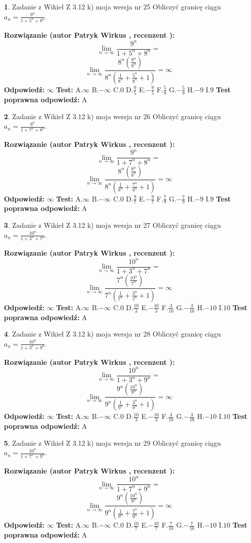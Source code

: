 \documentclass[12pt, a4paper]{article}
\theoremstyle{definition} %
\newtheorem{zad}{}
\newcommand{\zadStart}[1]{\begin{zad}#1\newline}
\newcommand{\zadStop}{\end{zad}}
\newcommand{\rozwStart}[2]{\noindent \textbf{Rozwiązanie (autor #1 , recenzent #2): }\newline}
\newcommand{\rozwStop}{\newline}
\newcommand{\odpStart}{\noindent \textbf{Odpowiedź:}\newline}
\newcommand{\odpStop}{\newline}
\newcommand{\testStart}{\noindent \textbf{Test:}\newline}
\newcommand{\testStop}{\newline}
\newcommand{\kluczStart}{\noindent \textbf{Test poprawna odpowiedź:}\newline}
\newcommand{\kluczStop}{\newline}
\begin{document}
\zadStart{Zadanie z Wikieł Z 3.12 k) moja wersja nr 25}
Obliczyć granicę ciągu $a_{n}=\frac{9^{n}}{1+5^{n} + 8^{n}}$.
\zadStop
\rozwStart{Patryk Wirkus}{}
$$\lim\limits_{n\to\infty}\frac{9^{n}}{1+5^{n} + 8^{n}}=$$
$$\lim\limits_{n\to\infty}\frac{8^{n}(\frac{9^{n}}{8^{n}} )}{8^{n}(\frac{1}{8^{n}}+\frac{5^{n}}{8^{n}}+1)} = \infty$$
\rozwStop
\odpStart
$\infty$
\odpStop
\testStart
A.$\infty$
B.$-\infty$
C.$0$
D.$\frac{9}{5}$
E.$-\frac{9}{5}$
F.$\frac{5}{9}$
G.$-\frac{5}{9}$
H.$-9$
I.$9$
\testStop
\kluczStart
A
\kluczStop



\zadStart{Zadanie z Wikieł Z 3.12 k) moja wersja nr 26}
Obliczyć granicę ciągu $a_{n}=\frac{9^{n}}{1+7^{n} + 8^{n}}$.
\zadStop
\rozwStart{Patryk Wirkus}{}
$$\lim\limits_{n\to\infty}\frac{9^{n}}{1+7^{n} + 8^{n}}=$$
$$\lim\limits_{n\to\infty}\frac{8^{n}(\frac{9^{n}}{8^{n}} )}{8^{n}(\frac{1}{8^{n}}+\frac{7^{n}}{8^{n}}+1)} = \infty$$
\rozwStop
\odpStart
$\infty$
\odpStop
\testStart
A.$\infty$
B.$-\infty$
C.$0$
D.$\frac{9}{7}$
E.$-\frac{9}{7}$
F.$\frac{7}{9}$
G.$-\frac{7}{9}$
H.$-9$
I.$9$
\testStop
\kluczStart
A
\kluczStop



\zadStart{Zadanie z Wikieł Z 3.12 k) moja wersja nr 27}
Obliczyć granicę ciągu $a_{n}=\frac{10^{n}}{1+3^{n} + 7^{n}}$.
\zadStop
\rozwStart{Patryk Wirkus}{}
$$\lim\limits_{n\to\infty}\frac{10^{n}}{1+3^{n} + 7^{n}}=$$
$$\lim\limits_{n\to\infty}\frac{7^{n}(\frac{10^{n}}{7^{n}} )}{7^{n}(\frac{1}{7^{n}}+\frac{3^{n}}{7^{n}}+1)} = \infty$$
\rozwStop
\odpStart
$\infty$
\odpStop
\testStart
A.$\infty$
B.$-\infty$
C.$0$
D.$\frac{10}{3}$
E.$-\frac{10}{3}$
F.$\frac{3}{10}$
G.$-\frac{3}{10}$
H.$-10$
I.$10$
\testStop
\kluczStart
A
\kluczStop



\zadStart{Zadanie z Wikieł Z 3.12 k) moja wersja nr 28}
Obliczyć granicę ciągu $a_{n}=\frac{10^{n}}{1+3^{n} + 9^{n}}$.
\zadStop
\rozwStart{Patryk Wirkus}{}
$$\lim\limits_{n\to\infty}\frac{10^{n}}{1+3^{n} + 9^{n}}=$$
$$\lim\limits_{n\to\infty}\frac{9^{n}(\frac{10^{n}}{9^{n}} )}{9^{n}(\frac{1}{9^{n}}+\frac{3^{n}}{9^{n}}+1)} = \infty$$
\rozwStop
\odpStart
$\infty$
\odpStop
\testStart
A.$\infty$
B.$-\infty$
C.$0$
D.$\frac{10}{3}$
E.$-\frac{10}{3}$
F.$\frac{3}{10}$
G.$-\frac{3}{10}$
H.$-10$
I.$10$
\testStop
\kluczStart
A
\kluczStop



\zadStart{Zadanie z Wikieł Z 3.12 k) moja wersja nr 29}
Obliczyć granicę ciągu $a_{n}=\frac{10^{n}}{1+7^{n} + 9^{n}}$.
\zadStop
\rozwStart{Patryk Wirkus}{}
$$\lim\limits_{n\to\infty}\frac{10^{n}}{1+7^{n} + 9^{n}}=$$
$$\lim\limits_{n\to\infty}\frac{9^{n}(\frac{10^{n}}{9^{n}} )}{9^{n}(\frac{1}{9^{n}}+\frac{7^{n}}{9^{n}}+1)} = \infty$$
\rozwStop
\odpStart
$\infty$
\odpStop
\testStart
A.$\infty$
B.$-\infty$
C.$0$
D.$\frac{10}{7}$
E.$-\frac{10}{7}$
F.$\frac{7}{10}$
G.$-\frac{7}{10}$
H.$-10$
I.$10$
\testStop
\kluczStart
A
\kluczStop
\end{document}
